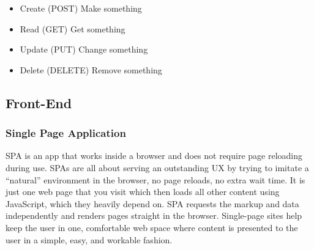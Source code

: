 \begin{itemize}
      \item 
      Create (POST) Make something
      \item 
      Read (GET) Get something
      \item 
      Update (PUT) Change something
      \item 
      Delete (DELETE) Remove something
\end{itemize}




\subsection{Front-End}
\subsubsection{Single Page Application}
\ac{SPA} is an app that works inside a browser and does not require page reloading during use.
SPAs are all about serving an outstanding UX by trying to imitate a “natural” environment in the browser, no page reloads, no extra wait time. It is just one web page that you visit which then loads all other content using JavaScript, which they heavily depend on.
SPA requests the markup and data independently and renders pages straight in the browser.
Single-page sites help keep the user in one, comfortable web space where content is presented to the user in a simple, easy, and workable fashion.
